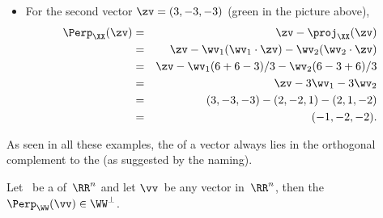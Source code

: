 \begin{example}
\begin{enumerate}[ref=\ref{eg:perpn}(\alph*)]
\begin{solution}
\begin{itemize}
\item For the second vector \(\zv=(3,-3,-3)\) (green in the picture above),
\begin{eqnarray*}
\Perp_\XX(\zv)
&=&\zv-\proj_\XX(\zv)
\\&=&\zv-\wv_1(\wv_1\cdot\zv)-\wv_2(\wv_2\cdot\zv)
\\&=&\zv-\wv_1(6+6-3)/3-\wv_2(6-3+6)/3
\\&=&\zv-3\wv_1-3\wv_2
\\&=&(3,-3,-3)-(2,-2,1)-(2,1,-2)
\\&=&(-1,-2,-2).
\end{eqnarray*}
\aqed
\end{itemize}
\end{solution}

\end{enumerate}
\end{example}


As seen in all these examples, the  of a vector always lies in the orthogonal complement to the   (as suggested by the naming).


\begin{theorem} \label{thm:perpn}
Let \WW\ be a  of~\(\RR^n\) and let \(\vv\)~be any vector in~\(\RR^n\), then the  \(\Perp_\WW(\vv)\in\WW^\perp\).
\end{theorem}

